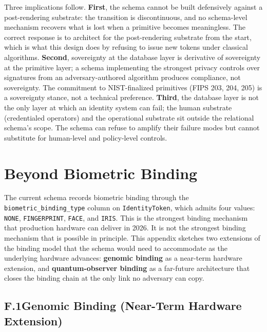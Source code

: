 \documentclass[11pt,letterpaper]{article}
\newcommand{\entity}[1]{\texttt{\color{navydark}#1}}
\begin{document}
Three implications follow. \textbf{First}, the schema cannot be built defensively against a post-rendering substrate: the transition is discontinuous, and no schema-level mechanism recovers what is lost when a primitive becomes meaningless. The correct response is to architect for the post-rendering substrate from the start, which is what this design does by refusing to issue new tokens under classical algorithms. \textbf{Second}, sovereignty at the database layer is derivative of sovereignty at the primitive layer; a schema implementing the strongest privacy controls over signatures from an adversary-authored algorithm produces compliance, not sovereignty. The commitment to NIST-finalized primitives (FIPS 203, 204, 205) is a sovereignty stance, not a technical preference. \textbf{Third}, the database layer is not the only layer at which an identity system can fail; the human substrate (credentialed operators) and the operational substrate sit outside the relational schema's scope. The schema can refuse to amplify their failure modes but cannot substitute for human-level and policy-level controls.

\section{Beyond Biometric Binding}
\label{app:beyond-biometric}

The current schema records biometric binding through the \texttt{biometric\_binding\_type} column on \entity{IdentityToken}, which admits four values: \texttt{NONE}, \texttt{FINGERPRINT}, \texttt{FACE}, and \texttt{IRIS}. This is the strongest binding mechanism that production hardware can deliver in 2026. It is not the strongest binding mechanism that is possible in principle. This appendix sketches two extensions of the binding model that the schema would need to accommodate as the underlying hardware advances: \textbf{genomic binding} as a near-term hardware extension, and \textbf{quantum-observer binding} as a far-future architecture that closes the binding chain at the only link no adversary can copy.

\subsection*{F.1\quad Genomic Binding (Near-Term Hardware Extension)}
\end{document}
